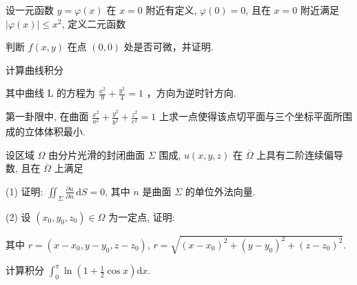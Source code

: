 \par{}
设一元函数 $y = \varphi(x)$ 在 $x = 0$ 附近有定义, $\varphi(0) = 0$, 且在 $x = 0$ 附近满足 $|\varphi(x)| \leq x^2$, 定义二元函数\par
\nopagebreak[4]
判断 $f(x,y)$ 在点 $(0,0)$ 处是否可微，并证明.\par
\par{}
计算曲线积分\par
\nopagebreak[4]
其中曲线 L 的方程为  $\frac{x^{2}}{9} + \frac{y^{2}}{4} = 1$ ，方向为逆时针方向.\par
第一卦限中, 在曲面 $\frac{x^2}{a^2} + \frac{y^2}{b^2} + \frac{z^2}{c^2} = 1$ 上求一点使得该点切平面与三个坐标平面所围成的立体体积最小.\par
\par{}
设区域 $\Omega$ 由分片光滑的封闭曲面 $\Sigma$ 围成, $u(x,y,z)$ 在 $\overline{\Omega}$ 上具有二阶连续偏导数, 且在 $\overline{\Omega}$ 上满足\par
\nopagebreak[4]
(1) 证明: $\iint_{\Sigma} \frac{\partial u}{\partial n} \, \mathrm{d}S = 0$, 其中 $n$ 是曲面 $\Sigma$ 的单位外法向量.\par
\par{}
(2) 设 $(x_0, y_0, z_0) \in \Omega$ 为一定点, 证明:\par
\nopagebreak[4]
其中 $r = (x - x_0, y - y_0, z - z_0)$, $r = \sqrt{(x - x_0)^2 + (y - y_0)^2 + (z - z_0)^2}$.\par
计算积分 $\int_0^\pi \ln \left(1 + \frac{1}{2}\cos x\right)\mathrm{d}x.$\par
